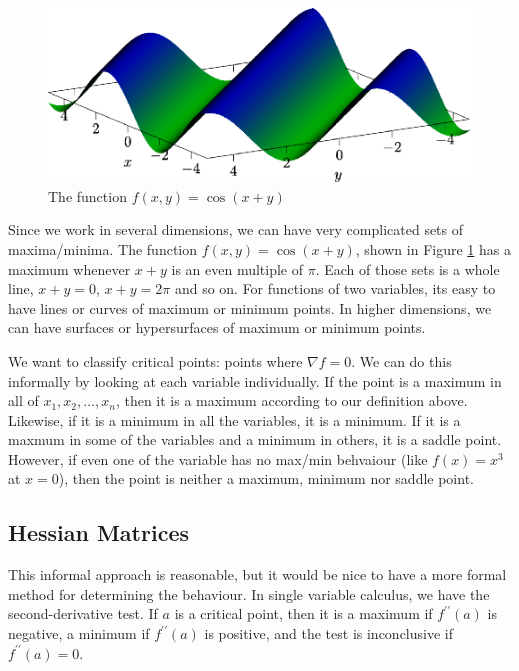 \documentclass[fleqn,letterpaper]{report}
\begin{document}
\begin{figure}[t]
\centering
\includegraphics[width=12cm]{figure44.eps}
\caption{The function $f(x,y) = \cos (x+y)$}
\label{figure-3d-graph6}
\end{figure}

\begin{example}
Since we work in several dimensions, we can have very
complicated sets of maxima/minima. The function $f(x,y) = \cos
(x+y)$, shown in Figure \ref{figure-3d-graph6} has a maximum whenever
$x+y$ is an even multiple of $\pi$. Each of those sets is a
whole line, $x+y=0$, $x+y = 2\pi$ and so on. For functions of
two variables, its easy to have lines or curves of maximum or
minimum points. In higher dimensions, we can have surfaces or
hypersurfaces of maximum or minimum points.
\end{example}

We want to classify critical points: points where $\nabla f =
0$. We can do this informally by looking at each variable
individually. If the point is a maximum in all of $x_1, x_2,
\ldots, x_n$, then it is a maximum according to our definition
above. Likewise, if it is a minimum in all the variables, it
is a minimum. If it is a maxmum in some of the variables and a
minimum in others, it is a saddle point. However, if even one
of the variable has no max/min behvaiour (like $f(x) = x^3$ at
$x=0$), then the point is neither a maximum, minimum nor
saddle point.

\subsection{Hessian Matrices}
\label{hessians}

This informal approach is reasonable, but it would be nice to
have a more formal method for determining the behaviour. In
single variable calculus, we have the second-derivative test.
If $a$ is a critical point, then it is a maximum if
$f^{\prime \prime}(a)$ is negative, a minimum if $f^{\prime
\prime}(a)$ is positive, and the test is inconclusive if
$f^{\prime \prime}(a) = 0$. 
\end{document}
